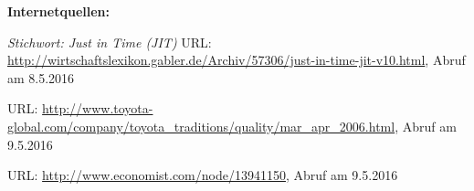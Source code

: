 \begin{thebibliography}{}
	\textbf{Internetquellen:}

	 {\sl Stichwort: Just in Time (JIT)} URL: \url{http://wirtschaftslexikon.gabler.de/Archiv/57306/just-in-time-jit-v10.html}, Abruf am 8.5.2016

	 URL: \url{	http://www.toyota-global.com/company/toyota_traditions/quality/mar_apr_2006.html}, Abruf am 9.5.2016
	
	 URL: \url{http://www.economist.com/node/13941150}, Abruf am 9.5.2016
	 
  \end{thebibliography}
